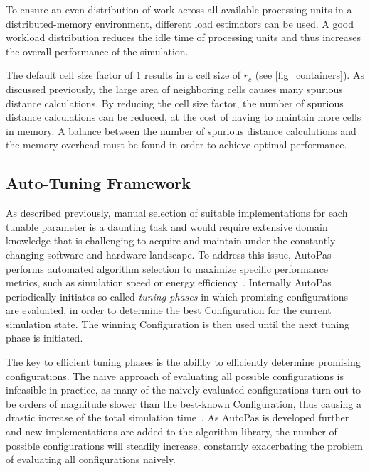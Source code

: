 \documentclass[conference]{IEEEtran}
\begin{document}
\begin{description}[style=nextline]
    \item[Load Estimator]
        To ensure an even distribution of work across all available processing units in a distributed-memory environment, different load estimators can be used. A good workload distribution reduces the idle time of processing units and thus increases the overall performance of the simulation.

    \item[Cell Size Factor]
        The default cell size factor of 1 results in a cell size of $r_c$ (see \autoref{fig_containers}). As discussed previously, the large area of neighboring cells causes many spurious distance calculations. By reducing the cell size factor, the number of spurious distance calculations can be reduced, at the cost of having to maintain more cells in memory\cite{Papula2020}. A balance between the number of spurious distance calculations and the memory overhead must be found in order to achieve optimal performance.
\end{description}


\subsection{Auto-Tuning Framework}

As described previously, manual selection of suitable implementations for each tunable parameter is a daunting task and would require extensive domain knowledge that is challenging to acquire and maintain under the constantly changing software and hardware landscape. To address this issue, AutoPas performs automated algorithm selection to maximize specific performance metrics, such as simulation speed or energy efficiency~\cite{Gratl2022AutoPas}. Internally AutoPas periodically initiates so-called \textit{tuning-phases} in which promising configurations are evaluated, in order to determine the best Configuration for the current simulation state. The winning Configuration is then used until the next tuning phase is initiated.

The key to efficient tuning phases is the ability to efficiently determine promising configurations. The naive approach of evaluating all possible configurations is infeasible in practice, as many of the naively evaluated configurations turn out to be orders of magnitude slower than the best-known Configuration, thus causing a drastic increase of the total simulation time~\cite{endreport.pdf}\cite{Manuel_Lerchner_Thesis.pdf}.
As AutoPas is developed further and new implementations are added to the algorithm library, the number of possible configurations will steadily increase, constantly exacerbating the problem of evaluating all configurations naively.
\end{document}
